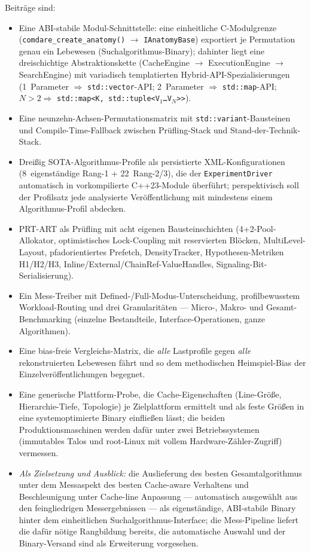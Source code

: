 Beiträge sind:
\begin{itemize}
  \item Eine ABI-stabile Modul-Schnittstelle: eine einheitliche C-Modulgrenze
  (\texttt{comdare\_\allowbreak{}create\_anatomy()} $\to$ \texttt{IAnatomyBase}) exportiert je
  Permutation genau ein Lebewesen (Suchalgorithmus-Binary); dahinter liegt eine dreischichtige
  Abstraktionskette (CacheEngine $\to$ ExecutionEngine $\to$ SearchEngine) mit variadisch
  templatierten Hybrid-API-Spezialisierungen (1~Parameter $\Rightarrow$ \texttt{std::vector}-API\@;
  2~Parameter $\Rightarrow$ \texttt{std::map}-API\@; $N>2 \Rightarrow$
  \texttt{std::map<K,\,std::tuple<V$_1$\ldots V$_N$>>}).
  \item Eine neunzehn-Achsen-Permutationsmatrix mit \texttt{std::variant}-Bausteinen und
  Compile-Time-Fallback zwischen Prüfling-Stack und Stand-der-Technik-Stack.
  \item Dreißig SOTA-Algorithmus-Profile als persistierte XML-Konfigurationen (8~eigenständige
  Rang-1 + 22~Rang-2/3), die der \texttt{ExperimentDriver} automatisch in vorkompilierte
  C++23-Module überführt; perspektivisch soll der Profilsatz jede analysierte Veröffentlichung mit
  mindestens einem Algorithmus-Profil abdecken.
  \item PRT-ART als Prüfling mit acht eigenen Bausteinschichten (4+2-Pool-Allokator, optimistisches
  Lock-Coupling mit reservierten Blöcken, MultiLevel-Layout, pfadorientiertes Prefetch,
  DensityTracker, Hypothesen-Metriken H1/H2/H3, Inline/External/ChainRef-ValueHandles,
  Signaling-Bit-Serialisierung).
  \item Ein Mess-Treiber mit Defined-/Full-Modus-Unterscheidung, profilbewusstem Workload-Routing
  und drei Granularitäten --- Micro-, Makro- und Gesamt-Benchmarking (einzelne Bestandteile,
  Interface-Operationen, ganze Algorithmen).
  \item Eine bias-freie Vergleichs-Matrix, die \emph{alle} Lastprofile gegen \emph{alle}
  rekonstruierten Lebewesen fährt und so dem methodischen Heimspiel-Bias der
  Einzelveröffentlichungen begegnet.
  \item Eine generische Plattform-Probe, die Cache-Eigenschaften (Line-Größe, Hierarchie-Tiefe,
  Topologie) je Zielplattform ermittelt und als feste Größen in eine systemoptimierte Binary
  einfließen lässt; die beiden Produktionsmaschinen werden dafür unter zwei Betriebssystemen
  (immutables Talos und root-Linux mit vollem Hardware-Zähler-Zugriff) vermessen.
  \item \emph{Als Zielsetzung und Ausblick:} die Auslieferung des besten Gesamtalgorithmus unter dem
  Messaspekt des besten Cache-aware Verhaltens und Beschleunigung unter Cache-line Anpassung ---
  automatisch ausgewählt aus den feingliedrigen Messergebnissen --- als eigenständige, ABI-stabile
  Binary hinter dem einheitlichen Suchalgorithmus-Interface; die Mess-Pipeline liefert die dafür
  nötige Rangbildung bereits, die automatische Auswahl und der Binary-Versand sind als Erweiterung
  vorgesehen.
\end{itemize}

